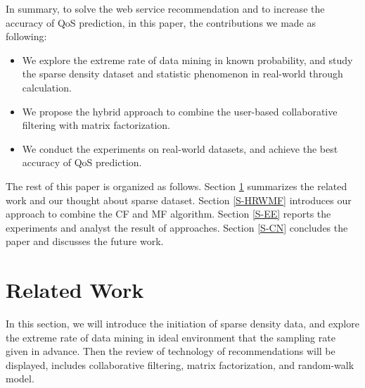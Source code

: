 \documentclass[conference]{IEEEtran}
\begin{document}
\par  In summary, to solve the web service recommendation and to increase the accuracy of QoS prediction, in this paper, the contributions we made as following:
\begin{itemize}
\item We explore the extreme rate of data mining in known probability, and study the sparse density dataset and statistic phenomenon in real-world through calculation.
\item We propose the hybrid approach to combine the user-based collaborative filtering with matrix factorization.
\item We conduct the experiments on real-world datasets, and achieve the best accuracy of QoS prediction.
\end{itemize}

\par The rest of this paper is organized as follows. Section \ref{S-RW} summarizes the related work and our thought about sparse dataset. Section \ref{S-HRWMF} introduces our approach to combine the CF and MF algorithm. Section \ref{S-EE} reports the experiments and analyst the result of approaches. Section \ref{S-CN} concludes the paper and discusses the future work. 

\section{Related Work}\label{S-RW}
In this section, we will introduce the initiation of sparse density data, and explore the extreme rate of data mining in ideal environment that the sampling rate given in advance. Then the review of technology of recommendations will be displayed, includes collaborative filtering, matrix factorization, and random-walk model.
\end{document}
